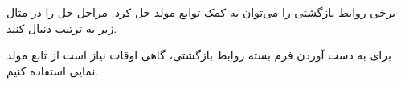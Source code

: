 \p
برخی روابط بازگشتی را می‌توان به کمک توابع مولد حل کرد.
مراحل حل را در مثال زیر به ترتیب دنبال کنید.





\p
برای به دست آوردن فرم بسته روابط بازگشتی، گاهی اوقات نیاز است از تابع مولد نمایی استفاده کنیم.

